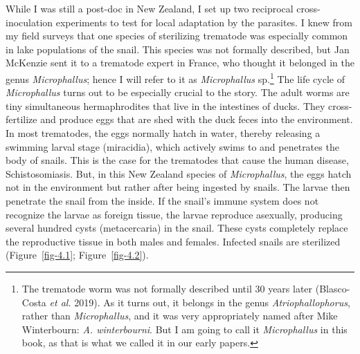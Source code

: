 \documentclass[
  letterpaper,
]{book}
\begin{document}
While I was still a post-doc in New Zealand, I set up two reciprocal
cross-inoculation experiments to test for local adaptation by the
parasites. I knew from my field surveys that one species of sterilizing
trematode was especially common in lake populations of the snail. This
species was not formally described, but Jan McKenzie sent it to a
trematode expert in France, who thought it belonged in the genus
\emph{Microphallus}; hence I will refer to it as \emph{Microphallus}
sp.\footnote{The trematode worm was not formally described until 30
  years later (Blasco-Costa \emph{et al.} 2019). As it turns out, it
  belongs in the genus \emph{Atriophallophorus}, rather than
  \emph{Microphallus}, and it was very appropriately named after Mike
  Winterbourn: \emph{A. winterbourni}. But I am going to call it
  \emph{Microphallus} in this book, as that is what we called it in our
  early papers.} The life cycle of \emph{Microphallus} turns out to be
especially crucial to the story. The adult worms are tiny simultaneous
hermaphrodites that live in the intestines of ducks. They
cross-fertilize and produce eggs that are shed with the duck feces into
the environment. In most trematodes, the eggs normally hatch in water,
thereby releasing a swimming larval stage (miracidia), which actively
swims to and penetrates the body of snails. This is the case for the
trematodes that cause the human disease, Schistosomiasis. But, in this
New Zealand species of \emph{Microphallus}, the eggs hatch not in the
environment but rather after being ingested by snails. The larvae then
penetrate the snail from the inside. If the snail's immune system does
not recognize the larvae as foreign tissue, the larvae reproduce
asexually, producing several hundred cysts (metacercaria) in the snail.
These cysts completely replace the reproductive tissue in both males and
females. Infected snails are sterilized (Figure~\ref{fig-4.1};
Figure~\ref{fig-4.2}).
\end{document}
